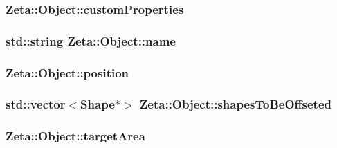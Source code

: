 \hypertarget{classZeta_1_1Object_a016caea2cc9a05ded2ce7a4c552bc6f3}{
\subsubsection[{custom\+Properties}]{ Zeta\+::\+Object\+::custom\+Properties\hspace{0.3cm}{\ttfamily [protected]}}}\label{classZeta_1_1Object_a016caea2cc9a05ded2ce7a4c552bc6f3}
\hypertarget{classZeta_1_1Object_ace4ef81b7c300e0a170292e9888cd66f}{
\subsubsection[{name}]{\setlength{\rightskip}{0pt plus 5cm}std\+::string Zeta\+::\+Object\+::name\hspace{0.3cm}{\ttfamily [protected]}}}\label{classZeta_1_1Object_ace4ef81b7c300e0a170292e9888cd66f}
\hypertarget{classZeta_1_1Object_a4035f758ac73cb1f0e4d85778d033956}{
\subsubsection[{position}]{ Zeta\+::\+Object\+::position\hspace{0.3cm}{\ttfamily [protected]}}}\label{classZeta_1_1Object_a4035f758ac73cb1f0e4d85778d033956}
\hypertarget{classZeta_1_1Object_a4680f2dd1ca348e68baa45386b20ee6b}{
\subsubsection[{shapes\+To\+Be\+Offseted}]{\setlength{\rightskip}{0pt plus 5cm}std\+::vector$<${\bf Shape}$\ast$$>$ Zeta\+::\+Object\+::shapes\+To\+Be\+Offseted\hspace{0.3cm}{\ttfamily [protected]}}}\label{classZeta_1_1Object_a4680f2dd1ca348e68baa45386b20ee6b}
\hypertarget{classZeta_1_1Object_aca5eecedb46a3e27855c60ae371ecb95}{
\subsubsection[{target\+Area}]{ Zeta\+::\+Object\+::target\+Area\hspace{0.3cm}{\ttfamily [protected]}}}\label{classZeta_1_1Object_aca5eecedb46a3e27855c60ae371ecb95}
